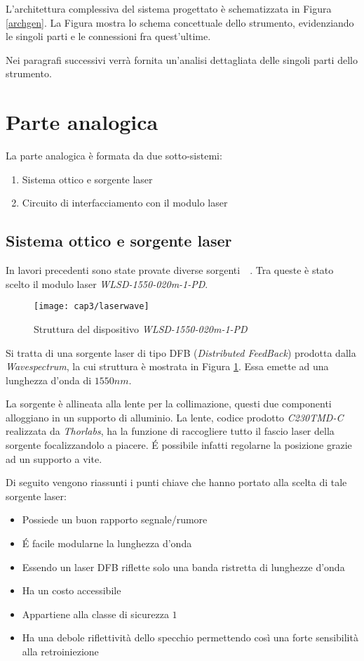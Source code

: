 L'architettura complessiva del sistema progettato è schematizzata in Figura \ref{archgen}. La Figura mostra lo schema concettuale dello strumento, evidenziando le singoli parti e le connessioni fra quest'ultime.

Nei paragrafi successivi verrà fornita un'analisi dettagliata delle singoli parti dello strumento.

\section{Parte analogica}
La parte analogica è formata da due sotto-sistemi:
\begin{enumerate}
	\item Sistema ottico e sorgente laser
	\item Circuito di interfacciamento con il modulo laser
\end{enumerate}

\subsection{Sistema ottico e sorgente laser}
In lavori precedenti sono state provate diverse sorgenti~\cite{thesispallsilv}~\cite{thesisstorti}. Tra queste è stato scelto il modulo laser \textit{WLSD-1550-020m-1-PD}.
\begin{figure}  
  \begin{center}
    \texttt{[image: cap3/laserwave]}
    \caption{Struttura del dispositivo \textit{WLSD-1550-020m-1-PD}}
    \label{laserwave}
  \end{center}
\end{figure}

Si tratta di una sorgente laser di tipo DFB (\textit{Distributed FeedBack}) prodotta dalla \textit{Wavespectrum}, la cui struttura è mostrata in Figura \ref{laserwave}. Essa emette ad una lunghezza d'onda di $1550nm$.

La sorgente è allineata alla lente per la collimazione, questi due componenti alloggiano in un supporto di alluminio. La lente, codice prodotto \textit{C230TMD-C} realizzata da \textit{Thorlabs}, ha la funzione di raccogliere tutto il fascio laser della sorgente focalizzandolo a piacere. \'E possibile infatti regolarne la posizione grazie ad un supporto a vite.

Di seguito vengono riassunti i punti chiave che hanno portato alla scelta di tale sorgente laser:
\begin{itemize}
	\item Possiede un buon rapporto segnale/rumore
	\item \'E facile modularne la lunghezza d'onda
	\item Essendo un laser DFB riflette solo una banda ristretta di lunghezze d'onda
	\item Ha un costo accessibile
	\item Appartiene alla classe di sicurezza $1$
	\item Ha una debole riflettività dello specchio permettendo così una forte sensibilità alla retroiniezione
\end{itemize}

